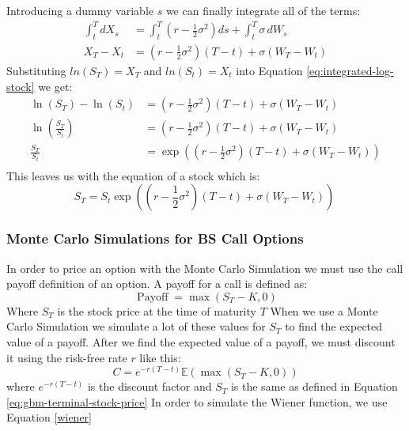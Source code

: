 \documentclass[12pt]{article}
\numberwithin{equation}{section}
\begin{document}
Introducing a dummy variable $s$ we can finally integrate all of the terms:
\begin{equation}
	\begin{aligned}
		\int_t^T dX_s
		&=
		\int_t^T \left(r-\frac{1}{2}\sigma^2\right)ds
		+\int_t^T \sigma\,dW_s \\
		X_T-X_t
		&=
		\left(r-\frac{1}{2}\sigma^2\right)(T-t)
		+\sigma(W_T-W_t)
	\end{aligned}
	\label{eq:integrated-log-stock}
\end{equation}
Substituting $ln(S_T) = X_T$ and $ln(S_t) = X_t$ into Equation \ref{eq:integrated-log-stock} we get:
\begin{equation}
	\begin{aligned}
		\ln(S_T)-\ln(S_t)
		&=
		\left(r-\frac{1}{2}\sigma^2\right)(T-t)
		+\sigma(W_T-W_t) \\
		\ln\left(\frac{S_T}{S_t}\right)
		&=
		\left(r-\frac{1}{2}\sigma^2\right)(T-t)
		+\sigma(W_T-W_t) \\
		\frac{S_T}{S_t}
		&=
		\exp\left(
		\left(r-\frac{1}{2}\sigma^2\right)(T-t)
		+\sigma(W_T-W_t)
		\right) \\
	\end{aligned}
\end{equation}
This leaves us with the equation of a stock which is:
\begin{equation}
	S_T = S_t\exp\left(
	\left(r-\frac{1}{2}\sigma^2\right)(T-t)
	+\sigma(W_T-W_t)
	\right)
	\
	\label{eq:gbm-terminal-stock-price}
\end{equation}
		

\subsubsection{Monte Carlo Simulations for BS Call Options}
In order to price an option with the Monte Carlo Simulation we must use the call payoff definition of an option. A payoff for a call is defined as:
\begin{equation}
	\operatorname{Payoff} = \max(S_T - K, 0)
	\label{eq:payoffBS}
\end{equation}
Where $S_T$ is the stock price at the time of maturity $T$
\newline \newline
When we use a Monte Carlo Simulation we simulate a lot of these values for $S_T$ to find the expected value of a payoff. After we find the expected value of a payoff, we must discount it using the risk-free rate $r$ like this:
\begin{equation}
	C = e^{-r(T-t)} \mathbb{E}(\max(S_T - K, 0))
	\label{callMC}
\end{equation}
where $e^{-r(T-t)}$ is the discount factor and $S_T$ is the same as defined in Equation \ref{eq:gbm-terminal-stock-price}
In order to simulate the Wiener function, we use Equation \ref{wiener}
\newpage
\end{document}
